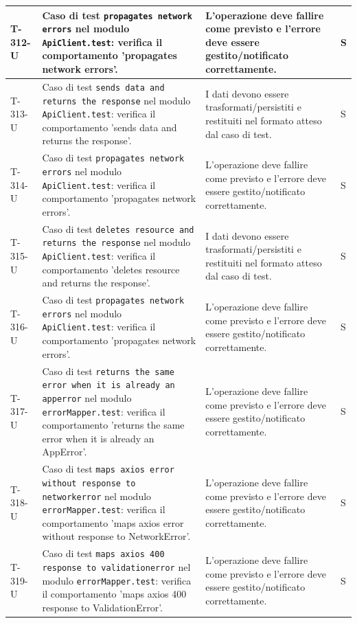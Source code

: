 \documentclass[a4paper,12pt]{article}
\begin{document}
{{\begin{longtable}{|>{\RaggedRight\arraybackslash}p{1.55cm}|>{\RaggedRight\arraybackslash}p{8.0cm}|>{\RaggedRight\arraybackslash}p{4.6cm}|>{\RaggedRight\arraybackslash}p{1.2cm}|}
        \hline
        T-312-U & Caso di test \texttt{propagates network errors} nel modulo \texttt{ApiClient.test}: verifica il comportamento 'propagates network errors'. & L'operazione deve fallire come previsto e l'errore deve essere gestito/notificato correttamente. & S \\
        \hline
        T-313-U & Caso di test \texttt{sends data and returns the response} nel modulo \texttt{ApiClient.test}: verifica il comportamento 'sends data and returns the response'. & I dati devono essere trasformati/persistiti e restituiti nel formato atteso dal caso di test. & S \\
        \hline
        T-314-U & Caso di test \texttt{propagates network errors} nel modulo \texttt{ApiClient.test}: verifica il comportamento 'propagates network errors'. & L'operazione deve fallire come previsto e l'errore deve essere gestito/notificato correttamente. & S \\
        \hline
        T-315-U & Caso di test \texttt{deletes resource and returns the response} nel modulo \texttt{ApiClient.test}: verifica il comportamento 'deletes resource and returns the response'. & I dati devono essere trasformati/persistiti e restituiti nel formato atteso dal caso di test. & S \\
        \hline
        T-316-U & Caso di test \texttt{propagates network errors} nel modulo \texttt{ApiClient.test}: verifica il comportamento 'propagates network errors'. & L'operazione deve fallire come previsto e l'errore deve essere gestito/notificato correttamente. & S \\
        \hline
        T-317-U & Caso di test \texttt{returns the same error when it is already an apperror} nel modulo \texttt{errorMapper.test}: verifica il comportamento 'returns the same error when it is already an AppError'. & L'operazione deve fallire come previsto e l'errore deve essere gestito/notificato correttamente. & S \\
        \hline
        T-318-U & Caso di test \texttt{maps axios error without response to networkerror} nel modulo \texttt{errorMapper.test}: verifica il comportamento 'maps axios error without response to NetworkError'. & L'operazione deve fallire come previsto e l'errore deve essere gestito/notificato correttamente. & S \\
        \hline
        T-319-U & Caso di test \texttt{maps axios 400 response to validationerror} nel modulo \texttt{errorMapper.test}: verifica il comportamento 'maps axios 400 response to ValidationError'. & L'operazione deve fallire come previsto e l'errore deve essere gestito/notificato correttamente. & S \\

\end{longtable}}}
\end{document}
